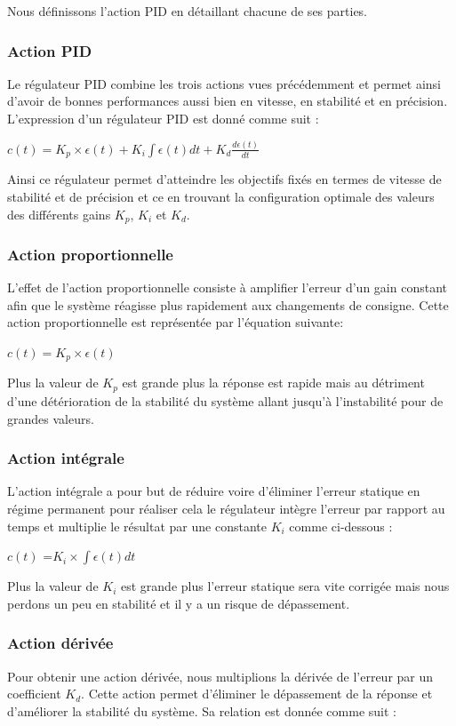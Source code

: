 Nous définissons l'action PID en détaillant chacune de ses parties.
\subsubsection {Action PID} 
Le régulateur PID combine les trois actions vues précédemment et permet ainsi d'avoir de bonnes performances aussi bien en vitesse, en stabilité et en précision. L'expression d’un régulateur PID \cite{WikiMemoiresa}est donné comme suit :

$ c(t)=K_p\times \epsilon(t) + K_i\int\epsilon(t)dt+K_d\frac{d\epsilon(t)}{dt}$


Ainsi ce régulateur permet d'atteindre les objectifs fixés en termes de vitesse de stabilité et de
précision et ce en trouvant la configuration optimale des valeurs des différents gains $K_p $, $ K_i$ et $ K_d$.
\subsubsection {Action proportionnelle}
L'effet de l’action proportionnelle consiste à amplifier l'erreur d’un gain constant afin que le
système réagisse plus rapidement aux changements de consigne. Cette action proportionnelle est
représentée par l'équation suivante:

$ c(t) = K_p\times \epsilon(t) $


Plus la valeur de $K_p$ est grande plus la réponse est rapide mais au détriment d'une détérioration
de la stabilité du système allant jusqu'à l'instabilité pour de grandes valeurs.
\subsubsection  {Action intégrale}
L'action intégrale a pour but de réduire voire d'éliminer l'erreur statique en régime permanent
pour réaliser cela le régulateur intègre l'erreur par rapport au temps et multiplie le résultat par une
constante $K_i$ comme ci-dessous :

$c(t) $ =$ K_i\times\int \epsilon(t) dt$


Plus la valeur de $K_i$ est grande plus l'erreur statique sera vite corrigée mais nous perdons un peu
en stabilité et il y a un risque de dépassement.

\subsubsection  {Action dérivée}
Pour obtenir une action dérivée, nous multiplions la dérivée de l'erreur par un coefficient $K_d$.
Cette action permet d'éliminer le dépassement de la réponse et d'améliorer la stabilité du système. Sa relation est donnée comme suit :

